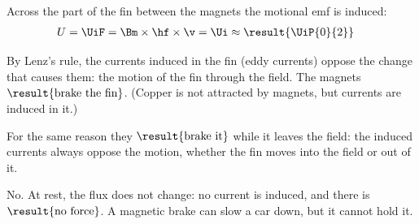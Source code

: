 \begin{abcliste}
\abc Across the part of the fin between the magnets the motional emf is induced:
\begin{align}
 U &= \UiF = \Bm\times\hf\times\v = \Ui \approx \result{\UiP{0}{2}}
\end{align}

\abc By Lenz's rule, the currents induced in the fin (eddy currents) oppose the change that causes them: the motion of the fin through the field. The magnets $\result{\text{brake the fin}}$. (Copper is not attracted by magnets, but currents are induced in it.)

\abc For the same reason they $\result{\text{brake it}}$ while it leaves the field: the induced currents always oppose the motion, whether the fin moves into the field or out of it.

\abc No. At rest, the flux does not change: no current is induced, and there is $\result{\text{no force}}$. A magnetic brake can slow a car down, but it cannot hold it.
\end{abcliste}

